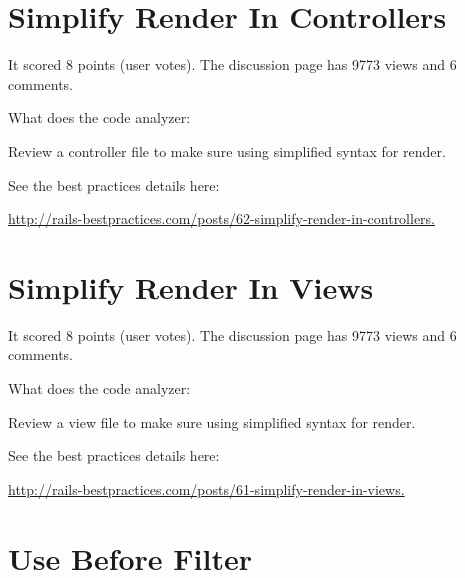 \section{Simplify Render In Controllers}


It scored 8 points (user votes). 
The discussion page has 9773 views and 6 comments.

What does the code analyzer:

Review a controller file to make sure using simplified syntax for render.

See the best practices details here:
 
\url{http://rails-bestpractices.com/posts/62-simplify-render-in-controllers.}

\section{Simplify Render In Views}


It scored 8 points (user votes). 
The discussion page has 9773 views and 6 comments.

What does the code analyzer:

Review a view file to make sure using simplified syntax for render.

See the best practices details here:

\url{http://rails-bestpractices.com/posts/61-simplify-render-in-views.}

\section{Use Before Filter}

